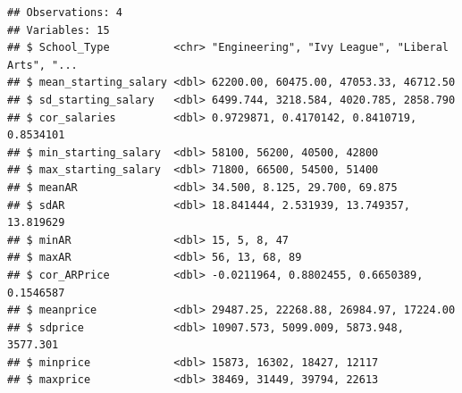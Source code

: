 \documentclass[]{article}
\newenvironment{Shaded}{\begin{snugshade}}{\end{snugshade}}
\newcommand{\KeywordTok}[1]{\textcolor[rgb]{0.13,0.29,0.53}{\textbf{#1}}}
\newcommand{\DataTypeTok}[1]{\textcolor[rgb]{0.13,0.29,0.53}{#1}}
\newcommand{\DecValTok}[1]{\textcolor[rgb]{0.00,0.00,0.81}{#1}}
\newcommand{\StringTok}[1]{\textcolor[rgb]{0.31,0.60,0.02}{#1}}
\newcommand{\OperatorTok}[1]{\textcolor[rgb]{0.81,0.36,0.00}{\textbf{#1}}}
\newcommand{\NormalTok}[1]{#1}
\begin{document}
\begin{verbatim}
## Observations: 4
## Variables: 15
## $ School_Type          <chr> "Engineering", "Ivy League", "Liberal Arts", "...
## $ mean_starting_salary <dbl> 62200.00, 60475.00, 47053.33, 46712.50
## $ sd_starting_salary   <dbl> 6499.744, 3218.584, 4020.785, 2858.790
## $ cor_salaries         <dbl> 0.9729871, 0.4170142, 0.8410719, 0.8534101
## $ min_starting_salary  <dbl> 58100, 56200, 40500, 42800
## $ max_starting_salary  <dbl> 71800, 66500, 54500, 51400
## $ meanAR               <dbl> 34.500, 8.125, 29.700, 69.875
## $ sdAR                 <dbl> 18.841444, 2.531939, 13.749357, 13.819629
## $ minAR                <dbl> 15, 5, 8, 47
## $ maxAR                <dbl> 56, 13, 68, 89
## $ cor_ARPrice          <dbl> -0.0211964, 0.8802455, 0.6650389, 0.1546587
## $ meanprice            <dbl> 29487.25, 22268.88, 26984.97, 17224.00
## $ sdprice              <dbl> 10907.573, 5099.009, 5873.948, 3577.301
## $ minprice             <dbl> 15873, 16302, 18427, 12117
## $ maxprice             <dbl> 38469, 31449, 39794, 22613
\end{verbatim}

\begin{Shaded}
\end{Shaded}
\end{document}
